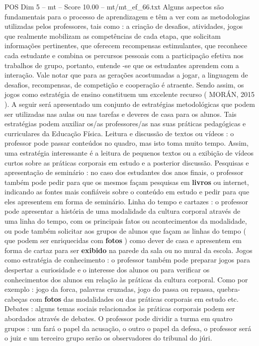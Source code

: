 \begin{textsample}{POS Dim 5 – mt – Score 10.00 – mt/mt\_ef\_66.txt}
Alguns aspectos são fundamentais para o processo de aprendizagem e têm a ver com as metodologias utilizadas pelos professores, tais como : a criação de desafios, atividades, jogos que realmente mobilizam as competências de cada etapa, que solicitam informações pertinentes, que oferecem recompensas estimulantes, que reconhece cada estudante e combina os percursos pessoais com a participação efetiva nos trabalhos de grupo, portanto, entende -se que os estudantes aprendem com a interação.
Vale notar que para as gerações acostumadas a jogar, a linguagem de desafios, recompensas, de competição e cooperação é atraente.
Sendo assim, os jogos como estratégia de ensino constituem um excelente recurso ( MORÁN, 2015 ).
A seguir será apresentado um conjunto de estratégias metodológicas que podem ser utilizadas nas aulas ou nas tarefas e deveres de casa para os alunos.
Tais estratégias podem auxiliar os/as professores/as nas suas práticas pedagógicas e curriculares da Educação Física.
Leitura e discussão de textos ou vídeos : o professor pode passar conteúdos no quadro, mas isto toma muito tempo.
Assim, uma estratégia interessante é a leitura de pequenos textos ou a exibição de vídeos curtos sobre as práticas corporais em estudo e a posterior discussão.
Pesquisas e apresentação de seminário : no caso dos estudantes dos anos finais, o professor também pode pedir para que os mesmos façam pesquisas em \textbf{livros} ou internet, indicando as fontes mais confiáveis sobre o conteúdo em estudo e pedir para que eles apresentem em forma de seminário.
Linha do tempo e cartazes : o professor pode apresentar a história de uma modalidade da cultura corporal através de uma linha do tempo, com os principais fatos ou acontecimentos da modalidade, ou pode também solicitar aos grupos de alunos que façam as linhas do tempo ( que podem ser enriquecidas com \textbf{fotos} ) como dever de casa e apresentem em forma de cartaz para ser \textbf{exibido} na parede da sala ou no mural da escola.
Jogos como estratégia de conhecimento : o professor também pode preparar jogos para despertar a curiosidade e o interesse dos alunos ou para verificar os conhecimentos dos alunos em relação às práticas da cultura corporal.
Como por exemplo : jogo da forca, palavras cruzadas, jogo do passa ou repassa, quebra-cabeças com \textbf{fotos} das modalidades ou das práticas corporais em estudo etc.
Debates : alguns temas sociais relacionados às práticas corporais podem ser abordados através de debates.
O professor pode dividir a turma em quatro grupos : um fará o papel da acusação, o outro o papel da defesa, o professor será o juiz e um terceiro grupo serão os observadores do tribunal do júri.

\end{textsample}
